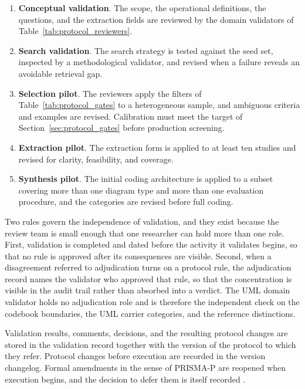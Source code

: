 \begin{enumerate}[label=\arabic*)]
    \item \textbf{Conceptual validation}. The scope, the operational definitions, the questions, and the extraction fields are reviewed by the domain validators of Table~\ref{tab:protocol_reviewers}.
    \item \textbf{Search validation}. The search strategy is tested against the seed set, inspected by a methodological validator, and revised when a failure reveals an avoidable retrieval gap.
    \item \textbf{Selection pilot}. The reviewers apply the filters of Table~\ref{tab:protocol_gates} to a heterogeneous sample, and ambiguous criteria and examples are revised. Calibration must meet the target of Section~\ref{sec:protocol_gates} before production screening.
    \item \textbf{Extraction pilot}. The extraction form is applied to at least ten studies and revised for clarity, feasibility, and coverage.
    \item \textbf{Synthesis pilot}. The initial coding architecture is applied to a subset covering more than one diagram type and more than one evaluation procedure, and the categories are revised before full coding.
\end{enumerate}

Two rules govern the independence of validation, and they exist because the review team is small enough that one researcher can hold more than one role. First, validation is completed and dated before the activity it validates begins, so that no rule is approved after its consequences are visible. Second, when a disagreement referred to adjudication turns on a protocol rule, the adjudication record names the validator who approved that rule, so that the concentration is visible in the audit trail rather than absorbed into a verdict. The UML domain validator holds no adjudication role and is therefore the independent check on the codebook boundaries, the UML carrier categories, and the reference distinctions.

Validation results, comments, decisions, and the resulting protocol changes are stored in the validation record together with the version of the protocol to which they refer. Protocol changes before execution are recorded in the version changelog. Formal amendments in the sense of PRISMA-P are reopened when execution begins, and the decision to defer them is itself recorded \cite{Shamseer2015PRISMAP}.

